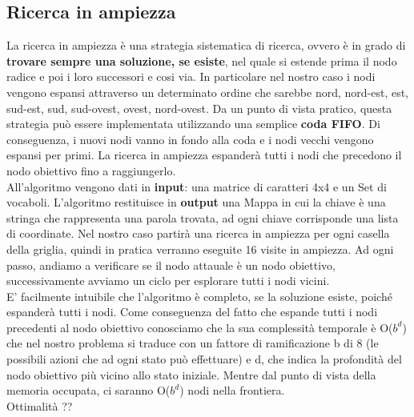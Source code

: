 \documentclass[10pt,a4paper]{article}
\begin{document}
	\subsection{Ricerca in ampiezza}
	La ricerca in ampiezza è una strategia sistematica di ricerca, ovvero è in grado di \textbf{trovare	sempre una soluzione, se esiste}, nel quale si estende prima il nodo radice e poi i loro successori	e cosi via. In particolare nel nostro caso i nodi vengono espansi attraverso un determinato ordine che sarebbe nord, nord-est, est, sud-est, sud, sud-ovest, ovest, nord-ovest.
	Da un punto di vista pratico, questa strategia può essere implementata utilizzando una semplice \textbf{coda FIFO}. Di conseguenza, i nuovi nodi vanno in fondo alla coda e i nodi vecchi vengono espansi per primi. La ricerca in ampiezza espanderà tutti i nodi che precedono il nodo obiettivo fino a raggiungerlo.\\
	All'algoritmo vengono dati in \textbf{input}: una matrice di caratteri 4x4 e un Set di vocaboli. L'algoritmo restituisce in \textbf{output} una Mappa in cui la chiave è una stringa che rappresenta una parola trovata, ad ogni chiave corrisponde una lista di coordinate.
	Nel nostro caso partirà una ricerca in ampiezza per ogni casella della griglia, quindi in pratica verranno eseguite 16 visite in ampiezza.
	Ad ogni passo, andiamo a verificare se il nodo attauale è un nodo obiettivo, successivamente avviamo un ciclo per esplorare tutti i nodi vicini.\\
	E’ facilmente intuibile che l’algoritmo è completo, se la soluzione esiste, poiché espanderà tutti i nodi.
	Come conseguenza del fatto che espande tutti i nodi precedenti al nodo obiettivo conosciamo che la sua complessità temporale è O($b^d$) che nel nostro problema si traduce con un fattore di ramificazione b di 8 (le possibili azioni che ad ogni stato può effettuare) e d, che indica la profondità del nodo obiettivo più vicino allo stato iniziale. Mentre dal punto di vista della memoria occupata, ci saranno O($b^d$) nodi nella frontiera.\\
	Ottimalità ??\\
\end{document}
